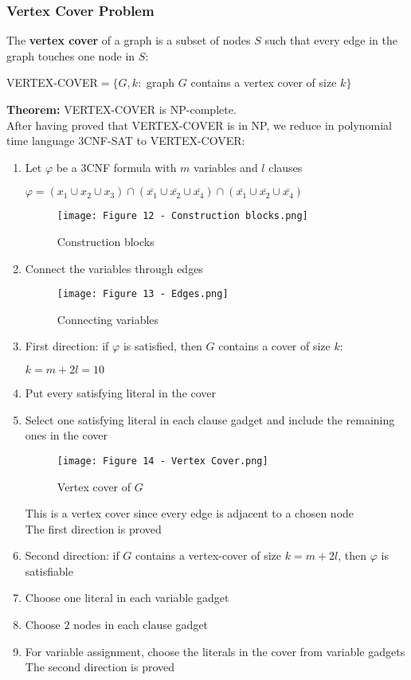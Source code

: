 \documentclass{article}
\begin{document}
\subsubsection{Vertex Cover Problem}
The \textbf{vertex cover} of a graph is a subset of nodes $S$ such that every edge in the graph touches one node in $S$:
\begin{center}
    VERTEX-COVER$ = \{ G,k : $ graph $G$ contains a vertex cover of size $k \}$
\end{center}
\textbf{Theorem:} VERTEX-COVER is NP-complete. \\
After having proved that VERTEX-COVER is in NP, we reduce in polynomial time language 3CNF-SAT to VERTEX-COVER:
\begin{enumerate}
    \item Let $\varphi$ be a 3CNF formula with $m$ variables and $l$ clauses 
        \begin{center}
            $\varphi = (x_1 \cup x_2 \cup x_3) \cap (\bar{x_1} \cup \bar{x_2} \cup \bar{x_4}) \cap (\bar{x_1} \cup \bar{x_2} \cup \bar{x_4})$
        \end{center}
        \begin{figure}[H]
            \centering
            \texttt{[image: Figure 12 - Construction blocks.png]}
            \caption{Construction blocks}
        \end{figure}
    \item Connect the variables through edges
        \begin{figure}[H]
            \centering
            \texttt{[image: Figure 13 - Edges.png]}
            \caption{Connecting variables}
        \end{figure}
    \item First direction: if $\varphi$ is satisfied, then $G$ contains a cover of size $k$:
        \begin{center}
            $k = m + 2l = 10$
        \end{center}
    \item Put every satisfying literal in the cover
    \item Select one satisfying literal in each clause gadget and include the remaining ones in the cover
        \begin{figure}
            \centering
            \texttt{[image: Figure 14 - Vertex Cover.png]}
            \caption{Vertex cover of $G$}
        \end{figure}
        This is a vertex cover since every edge is adjacent to a chosen node \\
        The first direction is proved
    \item Second direction: if $G$ contains a vertex-cover of size $k=m+2l$, then $\varphi$ is satisfiable
    \item Choose one literal in each variable gadget
    \item Choose $2$ nodes in each clause gadget
    \item For variable assignment, choose the literals in the cover from variable gadgets
        The second direction is proved
\end{enumerate}
\end{document}

